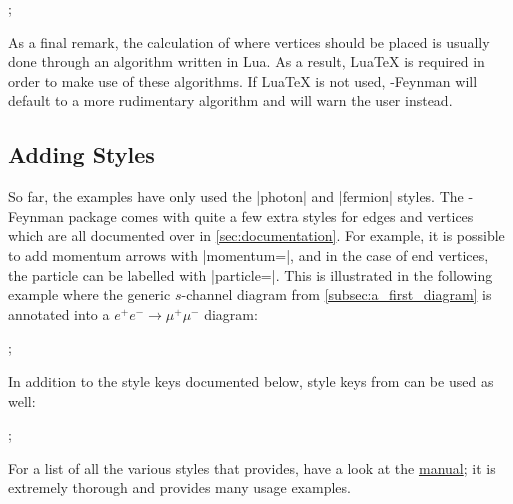 \documentclass[a4paper,final]{ltxdoc}
\providecommand{\LuaTeX}{Lua\TeX}
\providecommand{\tikzfeynmanname}{\tikzname-Feynman}
\providecommand{\pgfmanual}{\href{http://mirrors.ctan.org/graphics/pgf/base/doc/pgfmanual.pdf}{\tikzname{} manual}}
\begin{document}
\begin{codeexample}[]
;
\end{codeexample}

As a final remark, the calculation of where vertices should be placed is usually done through an algorithm written in Lua.  As a result, \LuaTeX{} is required in order to make use of these algorithms.  If \LuaTeX{} is not used, \tikzfeynmanname{} will default to a more rudimentary algorithm and will warn the user instead.

\subsection{Adding Styles}
\label{subsec:adding_styles}

So far, the examples have only used the |photon| and |fermion| styles.  The \tikzfeynmanname{} package comes with quite a few extra styles for edges and vertices which are all documented over in \cref{sec:documentation}.  For example, it is possible to add momentum arrows with |momentum=|, and in the case of end vertices, the particle can be labelled with |particle=|.  This is illustrated in the following example where the generic \(s\)-channel diagram from \cref{subsec:a_first_diagram} is annotated into a \(e^{+}e^{-} \to \mu^{+}\mu^{-}\) diagram:
\begin{codeexample}[]
;
\end{codeexample}
In addition to the style keys documented below, style keys from \tikzname{} can be used as well:
\begin{codeexample}[]
;
\end{codeexample}
For a list of all the various styles that \tikzname{} provides, have a look at the \pgfmanual; it is extremely thorough and provides many usage examples.
\end{document}
